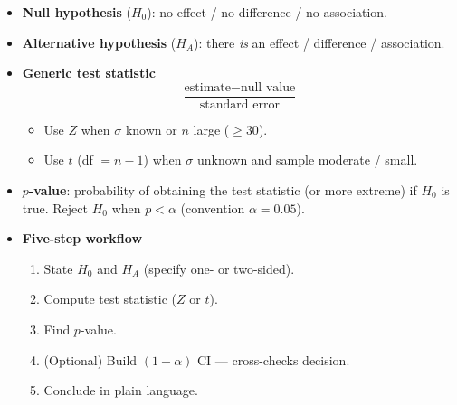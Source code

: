\documentclass[12pt]{book}
\begin{document}
\begin{itemize}
  \setlength{\itemsep}{6pt} %

  \item \textbf{Null hypothesis} ($H_{0}$): no effect / no difference / no association.
  \item \textbf{Alternative hypothesis} ($H_{A}$): there \emph{is} an effect / difference / association.

  \item \textbf{Generic test statistic}
        \[
          \frac{\text{estimate} - \text{null value}}{\text{standard error}}
        \]
        \begin{itemize}
          \setlength{\itemsep}{0pt}
          \item Use $Z$ when $\sigma$ known or $n$ large ($\ge 30$).
          \item Use $t$ (df $=n-1$) when $\sigma$ unknown and sample moderate / small.
        \end{itemize}

  \item \textbf{$p$-value}: probability of obtaining the test statistic
        (or more extreme) if $H_{0}$ is true.  
        Reject $H_{0}$ when $p<\alpha$ (convention $\alpha=0.05$).

  \item \textbf{Five-step workflow}  
        \begin{enumerate}
          \setlength{\itemsep}{2pt}
          \item State $H_{0}$ and $H_{A}$ (specify one- or two-sided).
          \item Compute test statistic ($Z$ or $t$).
          \item Find $p$-value.
          \item (Optional) Build $(1-\alpha)$ CI — cross-checks decision.
          \item Conclude in plain language.
        \end{enumerate}


\end{itemize}
\end{document}
